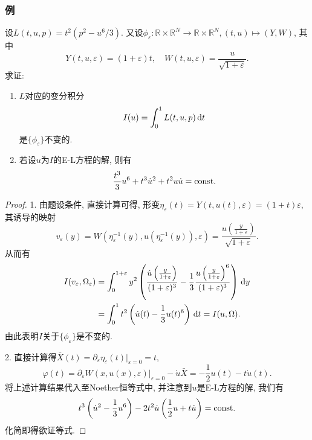 \subsubsection{例}

\begin{example}
    设$L(t, u, p) = t^2(p^2 - u^6/3)$. 又设$\phi_{\varepsilon}\colon \mathbb{R} \times \mathbb{R}^N \rightarrow \mathbb{R} \times \mathbb{R}^N , (t, u) \mapsto(Y, W)$, 其中 
    \begin{equation*}
        Y(t, u, \varepsilon) = (1 + \varepsilon)t, \quad W(t, u, \varepsilon) = \frac{u}{\sqrt{1 + \varepsilon}}. 
    \end{equation*}
    求证:
    \begin{enumerate}
        \item $L$对应的变分积分 
        \begin{equation*}
            I(u) = \int_0^1L(t, u, p) \,{\rm d}t
        \end{equation*}
        是$\{\phi_{\varepsilon}\}$不变的.
        \item 若设$u$为$I$的E-L方程的解, 则有 
        \begin{equation*}
            \frac{t^3}{3}u^6 + t^3\dot u^2 + t^2u\dot u = {\rm const}.
        \end{equation*}
    \end{enumerate}
    \begin{proof}
        1. 由题设条件, 直接计算可得, 形变$\eta_{\varepsilon}(t) = Y(t, u(t), \varepsilon) = (1 + t)\varepsilon$, 其诱导的映射 
        \begin{equation*}
            v_{\varepsilon}(y) = W(\eta_{\varepsilon}^{-1}(y), u(\eta_{\varepsilon}^{-1}(y)), \varepsilon) = \frac{u\left(\frac{y}{1 + \varepsilon}\right)}{\sqrt{1 + \varepsilon}}.
        \end{equation*}
        从而有 
        \begin{align*}
            I(v_{\varepsilon}, \Omega_{\varepsilon}) &= \int_0^{1 + \varepsilon}y^2\left(\frac{\dot u\left(\frac{y}{1 + \varepsilon}\right)}{(1 + \varepsilon)^3} - \frac{1}{3}\frac{u\left(\frac{y}{1 + \varepsilon}\right)^6}{(1 + \varepsilon)^3}\right) \,{\rm d}y \\  
            &= \int_0^1t^2\left(\dot u(t) - \frac{1}{3}u(t)^6\right) \,{\rm d}t =I(u, \Omega).
        \end{align*}
        由此表明$I$关于$\{\phi_{\varepsilon}\}$是不变的.

        2. 直接计算得$\bar{X}(t) = \partial_{\varepsilon}\eta_{\varepsilon}(t)|_{\varepsilon = 0} = t$, 
        \begin{equation*}
            \varphi(t) = \partial_{\varepsilon}W(x, u(x), \varepsilon)|_{\varepsilon = 0} - \dot u \bar{X} = -\frac{1}{2}u(t) - t\dot u(t).
        \end{equation*}
        将上述计算结果代入至Noether恒等式中, 并注意到$u$是E-L方程的解, 我们有
        \begin{equation*}
            t^3\left(\dot u^2 - \frac{1}{3}u^6\right) - 2t^2\dot u\left(\frac{1}{2}u + t\dot u\right) = {\rm const}.
        \end{equation*} 
        化简即得欲证等式.
    \end{proof}
\end{example}
